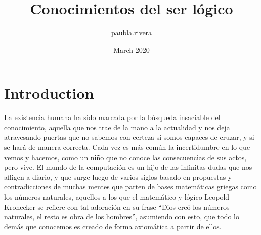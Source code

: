 \documentclass{article}
\title{Conocimientos del ser lógico}
\author{paubla.rivera }
\date{March 2020}
\begin{document}
\maketitle

\section*{Introduction}
La existencia humana ha sido marcada por la búsqueda insaciable del conocimiento, aquella que nos trae de la mano a la actualidad y nos deja atravesando puertas que no sabemos con certeza si somos capaces de cruzar, y si se hará de manera correcta. Cada vez es más común la incertidumbre en lo que vemos y hacemos, como un niño que no conoce las consecuencias de sus actos, pero vive.
El mundo de la computación es un hijo de las infinitas dudas que nos afligen a diario, y que surge luego de varios siglos basado en propuestas y contradicciones de muchas mentes que parten de bases matemáticas griegas como los números naturales, aquellos a los que el matemático y lógico Leopold Kronecker se refiere con tal adoración en su frase “Dios creó los números naturales, el resto es obra de los hombres”, asumiendo con esto, que todo lo demás que conocemos es creado de forma axiomática a partir de ellos. 
\end{document}
